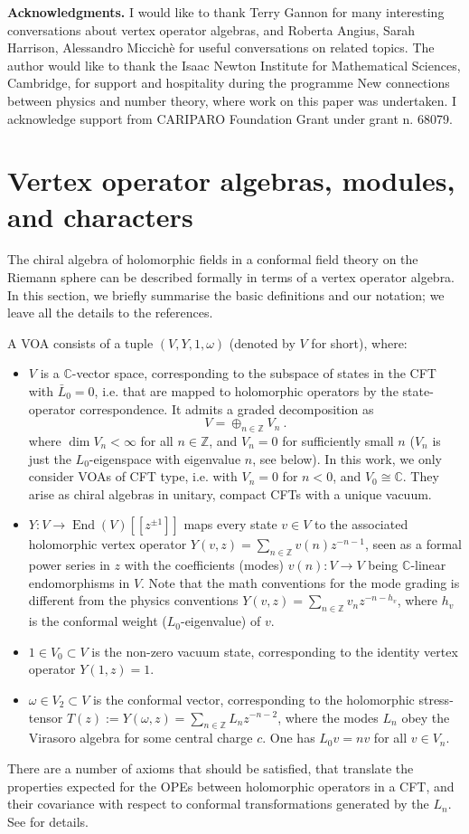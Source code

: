 \documentclass[11pt,reqno]{article}
\newcommand{\be}{\begin{equation}}
\newcommand{\ee}{\end{equation}}
\newcommand{\ZZ}{\mathbb{Z}}
\newcommand{\CC}{\mathbb{C}}
\DeclareMathOperator{\End}{End}
\begin{document}
\bigskip

{\bf Acknowledgments.} 
I would like to thank Terry Gannon for many interesting conversations about vertex operator algebras, and Roberta Angius, Sarah Harrison, Alessandro Miccich\`e for useful conversations on related topics. The author would like to thank the Isaac Newton Institute for Mathematical Sciences, Cambridge, for support and hospitality during the programme New connections between physics and number theory, where work on this paper was undertaken. I acknowledge support from CARIPARO Foundation Grant under
grant n. 68079.

\appendix

\section{Vertex operator algebras, modules, and characters}\label{a:VOA}

The chiral algebra of holomorphic fields in a  conformal field theory on the Riemann sphere can be described formally in terms of a vertex operator algebra. In this section, we briefly summarise the basic definitions and our notation; we leave all the details to the references.

A VOA consists of a tuple $(V,Y,1,\omega)$ (denoted  by $V$ for short), where:
\begin{itemize}
	\item $V$ is a $\CC$-vector space, corresponding to the subspace of states in the CFT with $\bar L_0=0$, i.e. that are mapped to holomorphic operators by the state-operator correspondence. It admits a graded decomposition as
	\be V=\oplus_{n\in \ZZ} V_n\ .
	\ee where $\dim V_n<\infty$ for all $n\in \ZZ$, and $V_n=0$ for sufficiently small $n$ ($V_n$ is just the $L_0$-eigenspace with eigenvalue $n$, see below). In this work, we only consider VOAs of CFT type, i.e. with $V_n=0$ for $n<0$, and $V_0\cong \CC$.  They arise as chiral algebras in unitary, compact CFTs with a unique vacuum.
	\item $Y:V\to \End(V)[[z^{\pm 1}]]$ maps every state $v\in V$ to the associated holomorphic vertex operator $Y(v,z)=\sum_{n\in \ZZ} v(n) z^{-n-1}$, seen as a formal power series in $z$ with the coefficients (modes) $v(n):V\to V$ being $\CC$-linear endomorphisms in $V$. Note that the math conventions for the mode grading is different from the physics conventions $Y(v,z)=\sum_{n\in \ZZ} v_n z^{-n-h_v}$, where $h_v$ is the conformal weight ($L_0$-eigenvalue) of $v$.
	\item $1 \in V_0\subset V$ is the non-zero vacuum state, corresponding to the identity vertex operator $Y(1,z)=1$.
	\item $\omega\in V_2\subset V$ is the conformal vector, corresponding to the holomorphic  stress-tensor $T(z):=Y(\omega,z)=\sum_{n\in \ZZ} L_n z^{-n-2}$, where the modes $L_n$ obey the Virasoro algebra for some central charge $c$. One has $L_0v=nv$ for all $v\in V_n$.
\end{itemize}  There are a number of axioms that should be satisfied, that translate the properties expected for the OPEs between holomorphic operators in a CFT, and their covariance with respect to conformal transformations generated by the $L_n$. See \cite{FLM1988} for details.
\end{document}

